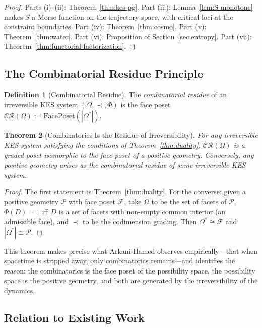 \documentclass[12pt, oneside]{amsart}
\theoremstyle{plain}
\newtheorem{theorem}{Theorem}[section]
\theoremstyle{definition}
\newtheorem{definition}[theorem]{Definition}
\theoremstyle{remark}
\newcommand{\Phif}{\Phi}   %
\newcommand{\Sf}{S}         %
\newcommand{\OmKS}{\Omega}
\begin{document}
\begin{proof}
Parts (i)--(ii): Theorem~\ref{thm:kes-pg}. Part (iii): Lemma~\ref{lem:S-monotone} makes $\Sf$ a Morse function on the trajectory space, with critical loci at the constraint boundaries. Part (iv): Theorem~\ref{thm:cosmo}. Part (v): Theorem~\ref{thm:water}. Part (vi): Proposition of Section~\ref{sec:entropy}. Part (vii): Theorem~\ref{thm:functorial-factorization}.
\end{proof}

\subsection{The Combinatorial Residue Principle}

\begin{definition}[Combinatorial Residue]
The \emph{combinatorial residue} of an irreversible KES system $(\OmKS, \prec, \Phif)$ is the face poset $\mathcal{CR}(\OmKS) := \mathrm{FacePoset}(|\OmKS^*|)$.
\end{definition}

\begin{theorem}[Combinatorics Is the Residue of Irreversibility]
\label{thm:comb-residue}
For any irreversible KES system satisfying the conditions of Theorem~\ref{thm:duality}, $\mathcal{CR}(\OmKS)$ is a graded poset isomorphic to the face poset of a positive geometry. Conversely, any positive geometry arises as the combinatorial residue of some irreversible KES system.
\end{theorem}

\begin{proof}
The first statement is Theorem~\ref{thm:duality}. For the converse: given a positive geometry $\mathcal{P}$ with face poset $\mathcal{F}$, take $\OmKS$ to be the set of facets of $\mathcal{P}$, $\Phif(D) = 1$ iff $D$ is a set of facets with non-empty common interior (an admissible face), and $\prec$ to be the codimension grading. Then $\OmKS^* \cong \mathcal{F}$ and $|\OmKS^*| \cong \mathcal{P}$.
\end{proof}

This theorem makes precise what Arkani-Hamed observes empirically---that when spacetime is stripped away, only combinatorics remains---and identifies the reason: the combinatorics is the face poset of the possibility space, the possibility space is the positive geometry, and both are generated by the irreversibility of the dynamics.

\subsection{Relation to Existing Work}
\end{document}

